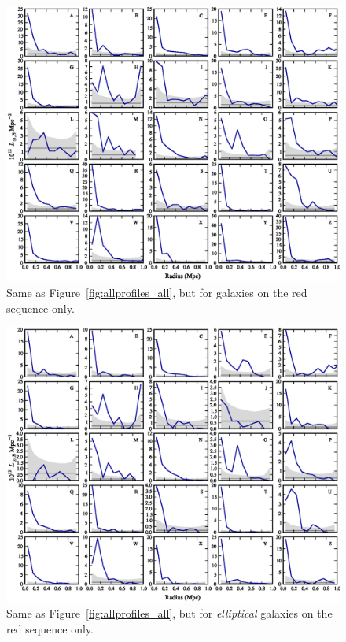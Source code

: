 \begin{figure}[tp]
\includegraphics[angle=270]{figures/clrate/allprofiles_rs.eps}
\caption[Luminosity profiles of 25 clusters -- red-sequence galaxies]
{Same as Figure~\ref{fig:allprofiles_all}, but for galaxies on the red
sequence only. \label{fig:allprofiles_rs}}
\end{figure}

\begin{figure}[tp]
\includegraphics[angle=270]{figures/clrate/allprofiles_rse.eps}
\caption[Luminosity profiles of 25 clusters -- red-sequence elliptical
  galaxies] {Same as Figure~\ref{fig:allprofiles_all}, but for {\it
    elliptical} galaxies on the red sequence
  only. \label{fig:allprofiles_rse}}
\end{figure}

